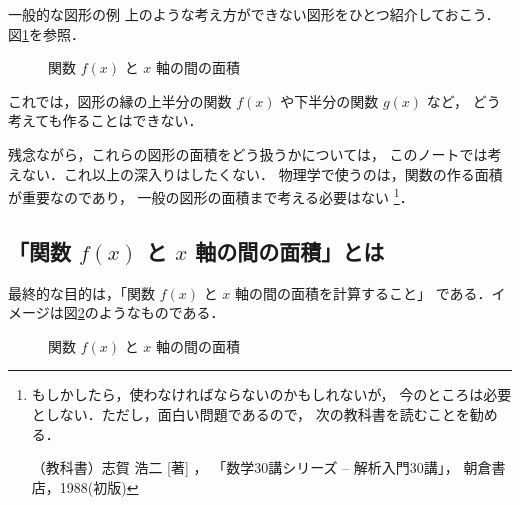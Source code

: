                \begin{memo}{一般的な図形の例}
                    上のような考え方ができない図形をひとつ紹介しておこう．
                    図\ref{fig:IntegFuncKangaeKata02}を参照．
                    \begin{figure}[hbt]
                        \begin{center}
                            \caption{関数 $f(x)$ と $x$ 軸の間の面積}
                            \label{fig:IntegFuncKangaeKata02}
                        \end{center}
                    \end{figure}

                    これでは，図形の縁の上半分の関数 $f(x)$ や下半分の関数 $g(x)$ など，
                    どう考えても作ることはできない．

                    残念ながら，これらの図形の面積をどう扱うかについては，
                    このノートでは考えない．これ以上の深入りはしたくない．
                    物理学で使うのは，関数の作る面積が重要なのであり，
                    一般の図形の面積まで考える必要はない
                        \footnote{
                            もしかしたら，使わなければならないのかもしれないが，
                            今のところは必要としない．ただし，面白い問題であるので，
                            次の教科書を読むことを勧める．

                            （教科書）志賀 浩二 [著] ，
                                        「数学30講シリーズ -- 解析入門30講」，
                                        朝倉書店，1988(初版)
                        }．
                \end{memo}

            \subsection{「関数 $f(x)$ と $x$ 軸の間の面積」とは}
                最終的な目的は，「関数 $f(x)$ と $x$ 軸の間の面積を計算すること」
                である．イメージは図\ref{fig:IntegFunc00}のようなものである．
                    \begin{figure}[hbt]
                        \begin{center}
                            \caption{関数 $f(x)$ と $x$ 軸の間の面積}
                            \label{fig:IntegFunc00}
                        \end{center}
                    \end{figure}

